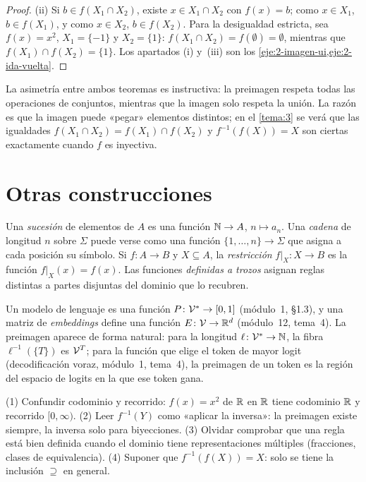 \begin{proof}
(ii) Si $b\in f(X_1\cap X_2)$, existe $x\in X_1\cap X_2$ con $f(x)=b$; como $x\in X_1$, $b\in f(X_1)$, y como $x\in X_2$, $b\in f(X_2)$. Para la desigualdad estricta, sea $f(x)=x^{2}$, $X_1=\{-1\}$ y $X_2=\{1\}$: $f(X_1\cap X_2)=f(\emptyset)=\emptyset$, mientras que $f(X_1)\cap f(X_2)=\{1\}$. Los apartados (i) y~(iii) son los \cref{eje:2-imagen-ui,eje:2-ida-vuelta}.
\end{proof}

La asimetría entre ambos teoremas es instructiva: la preimagen respeta todas las operaciones de conjuntos, mientras que la imagen solo respeta la unión. La razón es que la imagen puede «pegar» elementos distintos; en el \cref{tema:3} se verá que las igualdades $f(X_1\cap X_2)=f(X_1)\cap f(X_2)$ y $f^{-1}(f(X))=X$ son ciertas exactamente cuando $f$ es inyectiva.

\section{Otras construcciones}

Una \emph{sucesión} de elementos de $A$ es una función $\mathbb{N}\to A$, $n\mapsto a_n$. Una \emph{cadena} de longitud $n$ sobre $\Sigma$ puede verse como una función $\{1,\dots,n\}\to\Sigma$ que asigna a cada posición su símbolo. Si $f\colon A\to B$ y $X\subseteq A$, la \emph{restricción} $f|_X\colon X\to B$ es la función $f|_X(x)=f(x)$. Las funciones \emph{definidas a trozos} asignan reglas distintas a partes disjuntas del dominio que lo recubren.

\begin{observacion}
Un modelo de lenguaje es una función $P\colon\mathcal{V}^{*}\to[0,1]$ (módulo~1, §1.3), y una matriz de \emph{embeddings} define una función $E\colon\mathcal{V}\to\mathbb{R}^{d}$ (módulo~12, tema~4). La preimagen aparece de forma natural: para la longitud $\ell\colon\mathcal{V}^{*}\to\mathbb{N}$, la fibra $\ell^{-1}(\{T\})$ es $\mathcal{V}^{T}$; para la función que elige el token de mayor logit (decodificación voraz, módulo~1, tema~4), la preimagen de un token es la región del espacio de logits en la que ese token gana.
\end{observacion}

\begin{observacion}
(1) Confundir codominio y recorrido: $f(x)=x^{2}$ de $\mathbb{R}$ en $\mathbb{R}$ tiene codominio $\mathbb{R}$ y recorrido $[0,\infty)$. (2) Leer $f^{-1}(Y)$ como «aplicar la inversa»: la preimagen existe siempre, la inversa solo para biyecciones. (3) Olvidar comprobar que una regla está bien definida cuando el dominio tiene representaciones múltiples (fracciones, clases de equivalencia). (4) Suponer que $f^{-1}(f(X))=X$: solo se tiene la inclusión $\supseteq$ en general.
\end{observacion}

